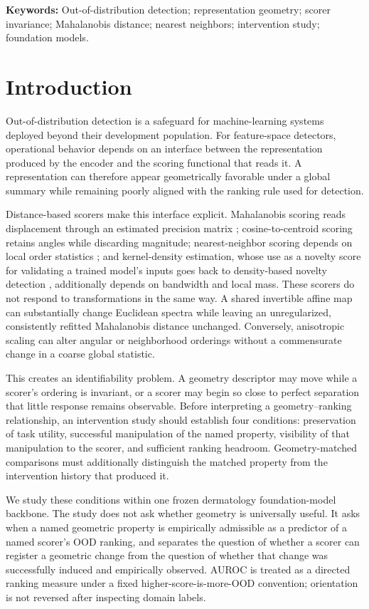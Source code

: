 \documentclass[11pt,a4paper]{article}
\begin{document}
\noindent\textbf{Keywords:} Out-of-distribution detection; representation geometry; scorer invariance; Mahalanobis distance; nearest neighbors; intervention study; foundation models.

\section{Introduction}
Out-of-distribution detection is a safeguard for machine-learning systems deployed beyond their development population. For feature-space detectors, operational behavior depends on an interface between the representation produced by the encoder and the scoring functional that reads it. A representation can therefore appear geometrically favorable under a global summary while remaining poorly aligned with the ranking rule used for detection.

Distance-based scorers make this interface explicit. Mahalanobis scoring reads displacement through an estimated precision matrix \cite{b1}; cosine-to-centroid scoring retains angles while discarding magnitude; nearest-neighbor scoring depends on local order statistics \cite{b2}; and kernel-density estimation, whose use as a novelty score for validating a trained model's inputs goes back to density-based novelty detection \cite{b25}, additionally depends on bandwidth and local mass. These scorers do not respond to transformations in the same way. A shared invertible affine map can substantially change Euclidean spectra while leaving an unregularized, consistently refitted Mahalanobis distance unchanged. Conversely, anisotropic scaling can alter angular or neighborhood orderings without a commensurate change in a coarse global statistic.

This creates an identifiability problem. A geometry descriptor may move while a scorer's ordering is invariant, or a scorer may begin so close to perfect separation that little response remains observable. Before interpreting a geometry--ranking relationship, an intervention study should establish four conditions: preservation of task utility, successful manipulation of the named property, visibility of that manipulation to the scorer, and sufficient ranking headroom. Geometry-matched comparisons must additionally distinguish the matched property from the intervention history that produced it.

We study these conditions within one frozen dermatology foundation-model backbone. The study does not ask whether geometry is universally useful. It asks when a named geometric property is empirically admissible as a predictor of a named scorer's OOD ranking, and separates the question of whether a scorer can register a geometric change from the question of whether that change was successfully induced and empirically observed. AUROC is treated as a directed ranking measure \cite{b17} under a fixed higher-score-is-more-OOD convention; orientation is not reversed after inspecting domain labels.
\end{document}
